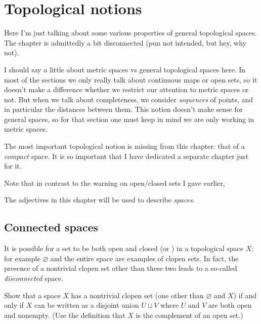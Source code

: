 \chapter{Topological notions}
\label{ch:top_more}
Here I'm just talking about some various properties of general topological spaces.
The chapter is admittedly a bit disconnected (pun not intended, but hey, why not).

I should say a little about metric spaces vs general topological spaces here.
In most of the sections we only really talk about continuous maps or open sets,
so it doesn't make a difference whether we restrict our attention
to metric spaces or not.
But when we talk about completeness, we consider \emph{sequences} of points,
and in particular the distances between them.
This notion doesn't make sense for general spaces, so for that section one must
keep in mind we are only working in metric spaces.

The most important topological notion is missing from this chapter:
that of a \emph{compact} space.
It is so important that I have dedicated a separate chapter just for it.

Note that in contrast to the warning on open/closed sets I gave earlier,
\begin{moral}
	The adjectives in this chapter will be used to describe \emph{spaces}.
\end{moral}


\section{Connected spaces}
It is possible for a set to be both open and closed (or ) in a
topological space $X$;
for example $\varnothing$ and the entire space are examples of clopen sets.
In fact, the presence of a nontrivial clopen set other than these two leads
to a so-called \emph{disconnected} space.

\begin{ques}
	Show that a space $X$ has a nontrivial clopen set
	(one other than $\varnothing$ and $X$)
	if and only if $X$ can be written as a disjoint union $U \sqcup V$
	where $U$ and $V$ are both open and nonempty.
	(Use the definition that $X$ is the complement of an open set.)
\end{ques}

